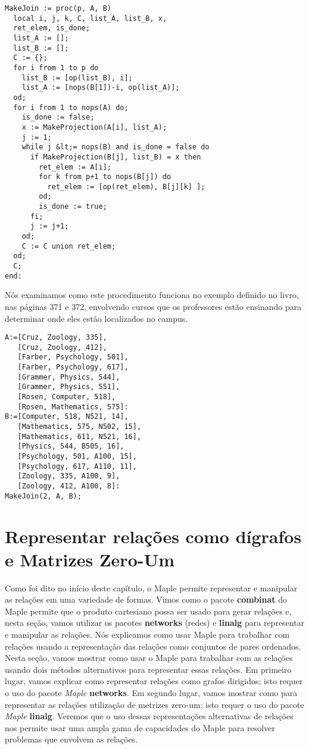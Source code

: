 \documentclass[a4paper]{article}
\begin{document}
\begin{lstlisting}
MakeJoin := proc(p, A, B)
  local i, j, k, C, list_A, list_B, x,
  ret_elem, is_done;
  list_A := [];
  list_B := [];
  C := {};
  for i from 1 to p do
    list_B := [op(list_B), i];
    list_A := [nops(B[1])-i, op(list_A)];
  od;
  for i from 1 to nops(A) do;
    is_done := false;
    x := MakeProjection(A[i], list_A);
    j := 1;
    while j &lt;= nops(B) and is_done = false do
      if MakeProjection(B[j], list_B) = x then
        ret_elem := A[i];
        for k from p+1 to nops(B[j]) do
          ret_elem := [op(ret_elem), B[j][k] ];
        od;
        is_done := true;
      fi;
      j := j+1;
    od;
    C := C union ret_elem;
  od;
  C;
end:
\end{lstlisting}

Nós examinamos como este procedimento funciona no exemplo definido no livro, nas páginas 371 e 372, envolvendo cursos que os professores estão ensinando para determinar onde eles estão localizados no campus.

\begin{lstlisting}
A:=[Cruz, Zoology, 335],
   [Cruz, Zoology, 412],
   [Farber, Psychology, 501],
   [Farber, Psychology, 617],
   [Grammer, Physics, 544],
   [Grammer, Physics, 551],
   [Rosen, Computer, 518],
   [Rosen, Mathematics, 575]:
B:=[Computer, 518, N521, 14],
   [Mathematics, 575, N502, 15],
   [Mathematics, 611, N521, 16],
   [Physics, 544, B505, 16],
   [Psychology, 501, A100, 15],
   [Psychology, 617, A110, 11],
   [Zoology, 335, A100, 9],
   [Zoology, 412, A100, 8]:
MakeJoin(2, A, B);
\end{lstlisting}

\section{Representar relações como dígrafos e Matrizes Zero-Um}
Como foi dito no início deste capítulo, o Maple permite representar e manipular as relações em uma variedade de formas. Vimos como o pacote \textbf{combinat} do Maple permite que o produto cartesiano possa ser usado para gerar relações e, nesta seção, vamos utilizar os pacotes \textbf{networks} (redes) e \textbf{linalg} para representar e manipular as relações. Nós explicamos como usar Maple para trabalhar com relações usando a representação das relações como conjuntos de pares ordenados. Nesta seção, vamos mostrar como usar o Maple para trabalhar com as relações usando dois métodos alternativos para representar essas relações. Em primeiro lugar, vamos explicar como representar relações como grafos dirigidos; isto requer o uso do pacote \textit{Maple} \textbf{networks}. Em segundo lugar, vamos mostrar como para representar as relações utilização de metrizes zero-um; isto requer o uso do pacote \textit{Maple} \textbf{linalg}. Veremos que o uso dessas representações alternativas de relações nos permite usar uma ampla gama de capacidades do Maple para resolver problemas que envolvem as relações.
\end{document}
